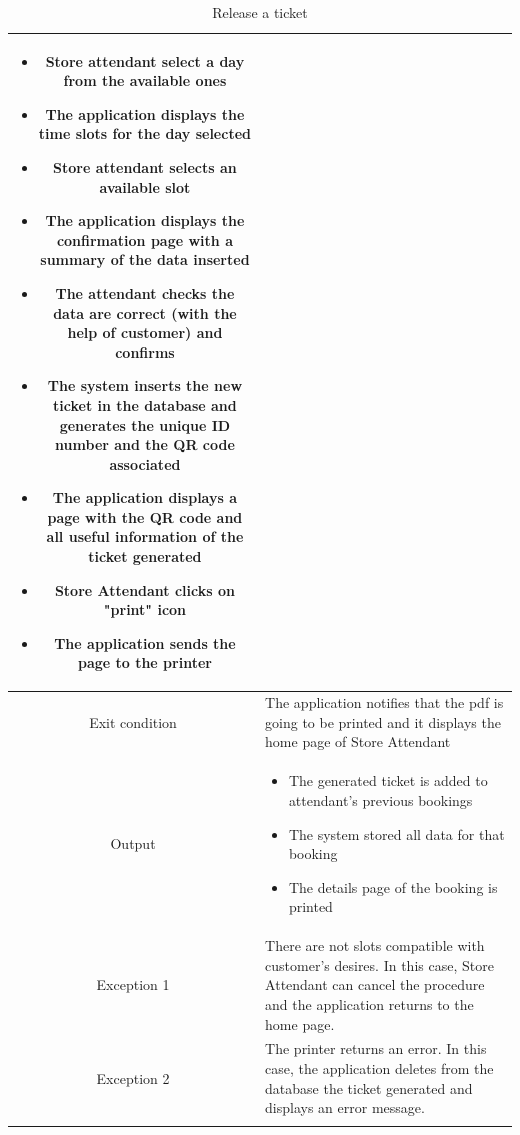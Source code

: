 \documentclass[table, 12pt]{article}
\begin{document}
\begin{longtable}{|c| p{10cm}|}
\begin{itemize}[nosep,after=\strut]
        \item Store attendant select a day from the available ones
        \item The application displays the time slots for the day selected
        \item Store attendant selects an available slot
        \item The application displays the confirmation page with a summary of the data inserted
        \item The attendant checks the data are correct (with the help of customer) and confirms
        \item The system inserts the new ticket in the database and generates the unique ID number and the QR code associated
        \item The application displays a page with the QR code and all useful information of the ticket generated
        \item Store Attendant clicks on "print" icon
        \item The application sends the page to the printer
    \end{itemize}                                                                                                                                   \\
    \hline
    Exit condition   & The application notifies that the pdf is going to be printed and it displays the home page of Store Attendant                                                \\ \hline
    Output           & \begin{itemize}
        \item The generated ticket is added to attendant's previous bookings
        \item The system stored all data for that booking
        \item The details page of the booking is printed
    \end{itemize}
    \\
    \hline
    \hline
    Exception 1      & There are not slots compatible with customer's desires. In this case, Store Attendant can cancel the procedure and the application returns to the home page. \\
    \hline
    Exception 2      & The printer returns an error. In this case, the application deletes from the database the ticket generated and displays an error message.                    \\
    \hline
    \caption{Release a ticket}                                                                                                                                                      \\
\end{longtable}
\end{document}
